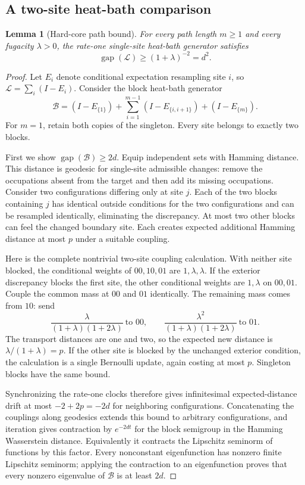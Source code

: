 \documentclass[11pt,a4paper]{article}
\newtheorem{lemma}[theorem]{Lemma}
\theoremstyle{remark}\newtheorem{remark}[theorem]{Remark}
\newcommand{\gap}{\operatorname{gap}}
\begin{document}
\subsection{A two-site heat-bath comparison}
\begin{lemma}[Hard-core path bound]\label{lem:hardcore}
For every path length $m\ge1$ and every fugacity $\lambda>0$, the rate-one single-site heat-bath generator satisfies
\begin{equation}\label{eq:hardcore-gap}
 \gap(\mathcal L)\ge(1+\lambda)^{-2}=d^2.
\end{equation}
\end{lemma}
\begin{proof}
Let $E_i$ denote conditional expectation resampling site $i$, so
$\mathcal L=\sum_i(I-E_i)$. Consider the block heat-bath generator
\[
 \mathcal B=(I-E_{\{1\}})+\sum_{i=1}^{m-1}(I-E_{\{i,i+1\}})
                 +(I-E_{\{m\}}).
\]
For $m=1$, retain both copies of the singleton. Every site belongs to exactly two blocks.

First we show $\gap(\mathcal B)\ge2d$. Equip independent sets with Hamming distance. This distance is geodesic for single-site admissible changes: remove the occupations absent from the target and then add its missing occupations. Consider two configurations differing only at site $j$. Each of the two blocks containing $j$ has identical outside conditions for the two configurations and can be resampled identically, eliminating the discrepancy. At most two other blocks can feel the changed boundary site. Each creates expected additional Hamming distance at most $p$ under a suitable coupling.

Here is the complete nontrivial two-site coupling calculation. With neither site blocked, the conditional weights of $00,10,01$ are $1,\lambda,\lambda$. If the exterior discrepancy blocks the first site, the other conditional weights are $1,\lambda$ on $00,01$. Couple the common mass at $00$ and $01$ identically. The remaining mass comes from $10$: send
\[
 \frac{\lambda}{(1+\lambda)(1+2\lambda)}\ \text{to }00,
 \qquad
 \frac{\lambda^2}{(1+\lambda)(1+2\lambda)}\ \text{to }01.
\]
The transport distances are one and two, so the expected new distance is
$\lambda/(1+\lambda)=p$. If the other site is blocked by the unchanged exterior condition, the calculation is a single Bernoulli update, again costing at most $p$. Singleton blocks have the same bound.

Synchronizing the rate-one clocks therefore gives infinitesimal expected-distance drift at most $-2+2p=-2d$ for neighboring configurations. Concatenating the couplings along geodesics extends this bound to arbitrary configurations, and iteration gives contraction by $e^{-2dt}$ for the block semigroup in the Hamming Wasserstein distance. Equivalently it contracts the Lipschitz seminorm of functions by this factor. Every nonconstant eigenfunction has nonzero finite Lipschitz seminorm; applying the contraction to an eigenfunction proves that every nonzero eigenvalue of $\mathcal B$ is at least $2d$.


\end{proof}
\end{document}
